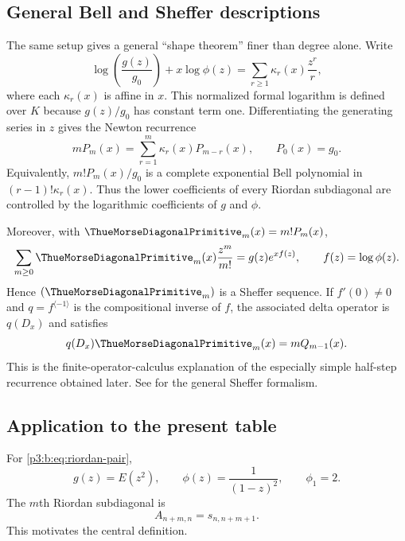 \documentclass[11pt,oneside]{article}
\numberwithin{equation}{section}
\theoremstyle{definition}
\theoremstyle{remark}
\begin{document}
\subsection{General Bell and Sheffer descriptions}

The same setup gives a general ``shape theorem'' finer than degree alone.
Write
\begin{equation}
 \log\!\left(\frac{g(z)}{g_0}\right)+x\log\phi(z)
 =\sum_{r\ge1}\kappa_r(x)\frac{z^r}{r},
 \label{p3:b:eq:general-cumulants}
\end{equation}
where each $\kappa_r(x)$ is affine in $x$.  This normalized formal logarithm
is defined over $K$ because $g(z)/g_0$ has constant term one.  Differentiating the generating
series in $z$ gives the Newton recurrence
\begin{equation}
 mP_m(x)=\sum_{r=1}^{m}\kappa_r(x)P_{m-r}(x),
 \qquad P_0(x)=g_0.
 \label{p3:b:eq:general-newton}
\end{equation}
Equivalently, $m!P_m(x)/g_0$ is a complete exponential Bell polynomial in
$(r-1)!\kappa_r(x)$.  Thus the lower coefficients of every Riordan
subdiagonal are controlled by the logarithmic coefficients of $g$ and
$\phi$.

Moreover, with $\ThueMorseDiagonalPrimitive_m(x)=m!P_m(x)$,
\begin{equation}
 \sum_{m\ge0}\ThueMorseDiagonalPrimitive_m(x)\frac{z^m}{m!}
 =g(z)e^{x f(z)},
 \qquad f(z)=\log\phi(z).
 \label{p3:b:eq:general-sheffer}
\end{equation}
Hence $(\ThueMorseDiagonalPrimitive_m)$ is a Sheffer sequence.  If $f'(0)\ne0$ and $q=f^{\langle-1\rangle}$
is the compositional inverse of $f$, the associated delta operator is
$q(D_x)$ and satisfies
\begin{equation}
 q(D_x)\ThueMorseDiagonalPrimitive_m(x)=mQ_{m-1}(x).
 \label{p3:b:eq:general-lowering}
\end{equation}
This is the finite-operator-calculus explanation of the especially simple
half-step recurrence obtained later.  See \cite{p3:roman} for the general
Sheffer formalism.

\subsection{Application to the present table}

For \eqref{p3:b:eq:riordan-pair},
\[
 g(z)=E(z^2),
 \qquad
 \phi(z)=\frac{1}{(1-z)^2},
 \qquad
 \phi_1=2.
\]
The $m$th Riordan subdiagonal is
\begin{equation}
 A_{n+m,n}=s_{n,n+m+1}.
\end{equation}
This motivates the central definition.
\end{document}
